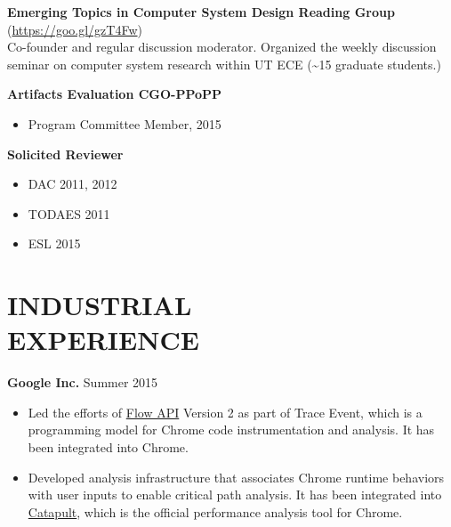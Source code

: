 \documentclass[margin, 9pt]{res} %
\begin{document}
\begin{resume}
\textbf{Emerging Topics in Computer System Design Reading Group} (\url{https://goo.gl/gzT4Fw})\\
Co-founder and regular discussion moderator. Organized the weekly discussion seminar on computer system research within UT ECE (\textasciitilde 15 graduate students.)

\textbf{Artifacts Evaluation CGO-PPoPP}\\
\vspace*{-10pt}
\begin{itemize}[leftmargin=*] \itemsep -3pt
\vspace*{-5pt}
	\item Program Committee Member, 2015\par
\end{itemize}

\textbf{Solicited Reviewer}\\
\vspace*{-10pt}
\begin{itemize}[leftmargin=*] \itemsep -3pt
\vspace*{-5pt}
	\item DAC 2011, 2012\par
	\item TODAES 2011\par
    \item ESL 2015\par
\end{itemize}


\section{INDUSTRIAL\\ EXPERIENCE} 

{\textbf{Google Inc.}} \hfill{Summer 2015}\\
\vspace*{-10pt}
\begin{itemize}[leftmargin=*] \itemsep -3pt
\vspace*{-5pt}
	\item Led the efforts of
\href{https://docs.google.com/document/d/1La_0PPfsTqHJihazYhff96thhjPtvq1KjAUOJu0dvEg/edit#heading=h.46jecek204ph}{Flow
API} Version 2 as part of Trace Event, which is a programming model for Chrome
code instrumentation and analysis. It has been integrated into Chrome.
	\item Developed analysis infrastructure that associates Chrome runtime
behaviors with user inputs to enable critical path analysis. It has been integrated into \href{https://github.com/catapult-project/catapult}{Catapult}, which is the official performance analysis tool for Chrome.
\end{itemize}


\end{resume}
\end{document}
